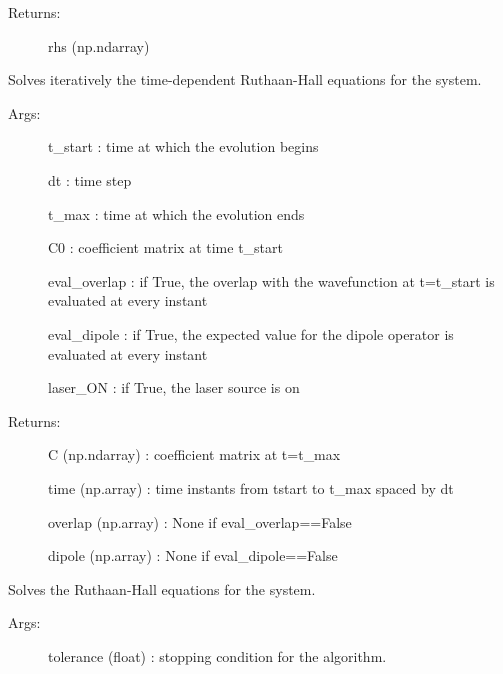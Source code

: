 \documentclass[letterpaper,10pt,english]{sphinxmanual}
\begin{document}
\begin{fulllineitems}
\begin{fulllineitems}
\begin{description}
\item[{Returns:}] \leavevmode
rhs (np.ndarray)

\end{description}

\end{fulllineitems}


\begin{fulllineitems}
\label{\detokenize{index:do.GHF.solve_TDHF}}
Solves iteratively the time-dependent Ruthaan-Hall equations for the system.
\begin{description}
\item[{Args:}] \leavevmode
t\_start : time at which the evolution begins

dt : time step

t\_max : time at which the evolution ends

C0 : coefficient matrix at time t\_start

eval\_overlap : if True, the overlap with the wavefunction at t=t\_start is evaluated at every instant

eval\_dipole : if True, the expected value for the dipole operator is evaluated at every instant

laser\_ON : if True, the laser source is on

\item[{Returns: }] \leavevmode
C (np.ndarray) : coefficient matrix at t=t\_max

time (np.array) : time instants from tstart to t\_max spaced by dt

overlap (np.array) : None if eval\_overlap==False

dipole (np.array) : None if eval\_dipole==False

\end{description}

\end{fulllineitems}


\begin{fulllineitems}
\label{\detokenize{index:do.GHF.solve_TIHF}}
Solves the Ruthaan-Hall equations for the system.
\begin{description}
\item[{Args:}] \leavevmode
tolerance (float) : stopping condition for the algorithm.


\end{description}
\end{fulllineitems}
\end{fulllineitems}
\end{document}
